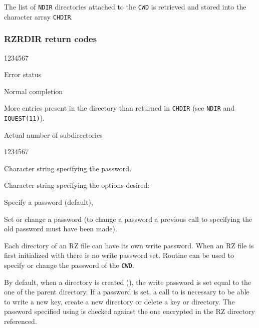 The list of {\tt NDIR} directories attached to the {\tt CWD} is 
retrieved and stored into the character array {\tt CHDIR}.

\subsubsection*{RZRDIR return codes}
\begin{DLtt}{1234567}
\item[IQUEST(1)]Error status
\begin{DLtt}{1}
\item[0]Normal completion
\item[1]More entries present in the directory than returned in {\tt CHDIR}
(see {\tt NDIR} and {\tt IQUEST(11)}).
\end{DLtt}
\item[IQUEST(11)]Actual number of subdirectories
\end{DLtt}


\begin{DLtt}{1234567}
\item[CHPASS]Character string specifying the password.
\item[CHOPT]Character string specifying the options desired:
\begin{DLtt}{12}
\item[' ']Specify a password (default),
\item['S']Set or change a password (to change a password a previous call to
 specifying the old password must have been made).
\end{DLtt}
\end{DLtt}

Each directory of an RZ file can have its own write password.
When an RZ file is first initialized with  there is
no write password set.
Routine  can be used to specify
or change the password of the {\tt CWD}.
\par By default, when a directory is created (), the write
password is set equal to the one of the parent directory.
If a password is set, a call to  is necessary to be able
to write a new key, create a new directory or delete a key or directory.
The password specified using  is
checked against the one encrypted in the RZ directory referenced.

